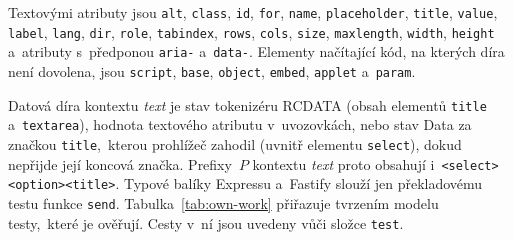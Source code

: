 Textovými atributy jsou \texttt{alt}, \texttt{class}, \texttt{id}, \texttt{for}, \texttt{name}, \texttt{placeholder}, \texttt{title}, \texttt{value}, \texttt{label}, \texttt{lang}, \texttt{dir}, \texttt{role}, \texttt{tabindex}, \texttt{rows}, \texttt{cols}, \texttt{size}, \texttt{maxlength}, \texttt{width}, \texttt{height} a~atributy s~předponou \texttt{aria-} a~\texttt{data-}. Elementy načítající kód, na kterých díra není dovolena, jsou \texttt{script}, \texttt{base}, \texttt{object}, \texttt{embed}, \texttt{applet} a~\texttt{param}.

Datová díra kontextu \emph{text} je stav tokenizéru RCDATA (obsah elementů \texttt{title} a~\texttt{textarea}), hodnota textového atributu v~uvozovkách, nebo stav Data za značkou \texttt{title},~kterou prohlížeč zahodil (uvnitř elementu \texttt{select}), dokud nepřijde její koncová značka. Prefixy~$P$ kontextu \emph{text} proto obsahují i~\texttt{<select><option><title>}. Typové balíky Expressu a~Fastify slouží jen překladovému testu funkce \texttt{send}. Tabulka~\ref{tab:own-work} přiřazuje tvrzením modelu testy,~které je ověřují. Cesty v~ní jsou uvedeny vůči složce \texttt{test}.

